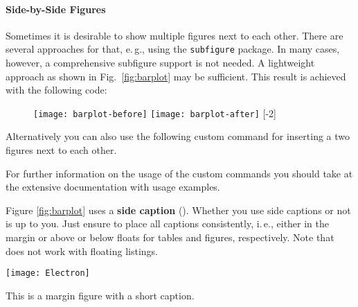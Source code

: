 \paragraph{Side-by-Side Figures} Sometimes it is desirable to show multiple figures next to each other. There are several approaches for that, e.\,g., using the \texttt{subfigure} package. In many cases, however, a comprehensive subfigure support is not needed. A lightweight approach as shown in Fig.~\ref{fig:barplot} may be sufficient. This result is achieved with the following code:
\begin{latex}
\begin{figure}[t]
\centering
\texttt{[image: barplot-before]}%
\hspace{\fill}%
\texttt{[image: barplot-after]}
[-2\baselineskip]
\end{figure}
\end{latex}

Alternatively you can also use the following custom command for inserting a two figures next to each other.

\begin{latex}
\end{latex}

For further information on the usage of the custom commands you should take at the extensive documentation with usage examples.

Figure \ref{fig:barplot} uses a \textbf{side caption} (). Whether you use side captions or not is up to you.
Just ensure to place all captions consistently, i.\,e., either in the margin or above or below floats for tables and figures, respectively. Note that  does not work with floating listings.

\begin{marginfigure}[1\baselineskip] %
\texttt{[image: Electron]}
\caption{\label{fig:marfig}This is a margin figure with a short caption.}
\end{marginfigure}

